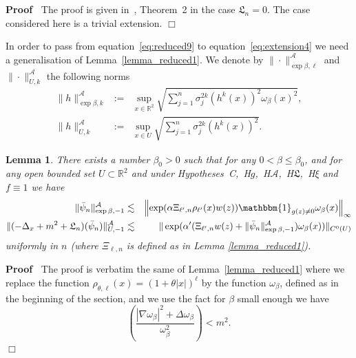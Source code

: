 \documentclass[a4paper,10pt]{article}
\newcommand{\assign}{:=}
\newenvironment{proof}{\noindent\textbf{Proof\ }}{\hspace*{\fill}$\Box$\medskip}
\newtheorem{lemma}{Lemma}
\begin{document}
\begin{proof}
  The proof is given in~{\cite{Albeverio2018elliptic}}, Theorem~2 in the case
  $\mathfrak{L}_n = 0$. The case considered here is a trivial extension. 
\end{proof}

In order to pass from equation~{\eqref{eq:reduced9}} to
equation~{\eqref{eq:extension4}} we need a generalisation of
Lemma~\ref{lemma_reduced1}. We denote by $\| \cdot \|_{\exp \beta,
\ell}^{\mathcal{A}}$ and $\| \cdot \|^{\mathcal{A}}_{U, k}$ the following
norms
\[ \begin{array}{lll}
     \| h \|^{\mathcal{A}}_{\exp \beta, k} & \assign & \sup_{x \in
     \mathbb{R}^2} \sqrt{\sum_{j = 1}^n \sigma_j^{2 k} (h^k (x))^2
     \omega_{\beta} (x)^2},\\
     \| h \|^{\mathcal{A}}_{U, k} & \assign & \sup_{x \in U} \sqrt{\sum_{j =
     1}^n \sigma_j^{2 k} (h^k (x))^2} .
   \end{array} \]


\begin{lemma}
  \label{lemma_extension2}There exists a number $\beta_0 > 0$ such that for
  any $0 < \beta \leqslant \beta_0$, and for any open bounded set $U \subset
  \mathbb{R}^2$ and under
  Hypotheses~C,~H$g$,~H$\mathcal{A}$,~H$\mathfrak{L}$,~H$\xi$ and $f \equiv 1$
  we have
  \begin{eqnarray}
    \| \bar{\psi}_n \|^{\mathcal{A}}_{\exp \beta, - 1} & \lesssim & \left\|
    \exp (\alpha \Xi_{\ell', n} \rho_{\ell'} (x) w (z)) \mathbbm{1}_{g (z)
    \not{=} 0} \omega_{\beta} (x) \right\|_{\infty} \label{eq:extension5} \\
    \| (- \Delta_x + m^2 + \mathfrak{L}_n) (\bar{\psi}_n) \|^{\mathcal{A}}_{U,
    - 1} & \lesssim & \| \exp (\alpha' (\Xi_{\ell', n} w (z) + \| \bar{\psi}_n
    \|^{\mathcal{A}}_{\exp \beta, - 1}) \omega_{\beta} (x)) \|_{C^0 (U)}
    \label{eq:extension6} 
  \end{eqnarray}
  uniformly in $n$ (where $\Xi_{\ell, n}$ is defined as in Lemma
  \ref{lemma_reduced1}).
\end{lemma}

\begin{proof}
  The proof is verbatim the same of Lemma~\ref{lemma_reduced1} where we
  replace the function $\rho_{\theta, \ell} (x) = (1 + \theta | x |)^{\ell}$
  by the function $\omega_{\beta}$, defined as in the beginning of the
  section, and we use the fact for $\beta$ small enough we have
  \[ \left( \frac{| \nabla \omega_{\beta} |^2 + \Delta
     \omega_{\beta}}{\omega_{\beta}^2} \right) < m^2 . \]
\end{proof}
\end{document}
